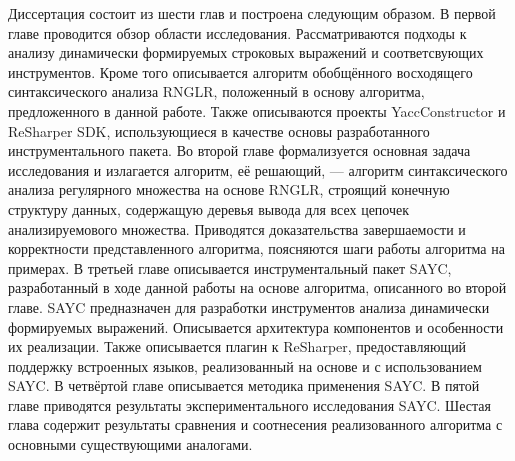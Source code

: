 Диссертация состоит из шести глав и построена следующим образом. В первой главе проводится обзор области исследования. Рассматриваются подходы к анализу динамически формируемых строковых выражений и соответсвующих инструментов. Кроме того описывается алгоритм обобщённого восходящего синтаксического анализа RNGLR, положенный в основу алгоритма, предложенного в данной работе. Также описываются проекты YaccConstructor и ReSharper SDK, использующиеся в качестве основы разработанного инструментального пакета. Во второй главе формализуется основная задача исследования и излагается алгоритм, её решающий, --- алгоритм синтаксического анализа регулярного множества на основе RNGLR, строящий конечную структуру данных, содержащую деревья вывода для всех цепочек анализируемового множества. Приводятся доказательства завершаемости и корректности представленного алгоритма, поясняются шаги работы алгоритма на примерах. В третьей главе описывается инструментальный пакет SAYC, разработанный в ходе данной работы на основе алгоритма, описанного во второй главе. SAYC предназначен для разработки инструментов анализа динамически формируемых выражений. Описывается архитектура компонентов и особенности их реализации. Также описывается плагин к ReSharper, предоставляющий поддержку встроенных языков, реализованный на основе и с использованием SAYC. В четвёртой главе описывается методика применения SAYC.  В пятой главе приводятся результаты экспериментального исследования SAYC. Шестая глава содержит результаты сравнения и соотнесения реализованного алгоритма с основными существующими аналогами.


\clearpage
